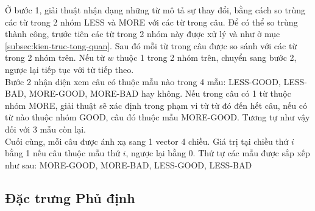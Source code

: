 Ở bước 1, giải thuật nhận dạng những từ mô tả sự thay đổi, bằng cách so trùng các từ trong 2 nhóm LESS và MORE với các từ trong câu. Để có thể so trùng thành công, trước tiên các từ trong 2 nhóm này được xử lý  và  như ở mục \ref{subsec:kien-truc-tong-quan}. Sau đó mỗi từ trong câu được so sánh với các từ trong 2 nhóm trên.  Nếu từ $w$ thuộc 1 trong 2 nhóm trên, chuyển sang bước 2, ngược lại tiếp tục với từ tiếp theo.\\


Bước 2 nhận diện xem câu có thuộc mẫu nào trong 4 mẫu: LESS-GOOD, LESS-BAD, MORE-GOOD, MORE-BAD hay không. Nếu trong câu có 1 từ thuộc nhóm MORE, giải thuật sẽ xác định trong phạm vi từ từ đó đến hết câu, nếu có từ nào thuộc nhóm GOOD, câu đó thuộc mẫu MORE-GOOD. Tương tự như vậy đối với 3 mẫu còn lại.\\

Cuối cùng, mỗi câu được ánh xạ sang 1 vector 4 chiều. Giá trị tại chiều thứ $i$ bằng 1 nếu câu thuộc mẫu thứ $i$, ngược lại bằng 0. Thứ tự các mẫu được sắp xếp như sau: MORE-GOOD, MORE-BAD, LESS-GOOD, LESS-BAD

\subsection{Đặc trưng Phủ định} \label{sec:su-phu-dinh} \label{subsec:negation}
